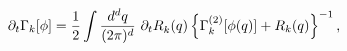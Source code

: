 \begin{equation}
\partial_t \Gamma_k[\phi] = {1 \over2} \int {d^dq\over (2\pi)^d}\
{\partial_t R}_k(q)
\left\{\Gamma_k^{(2)}[\phi(q)] + R_k(q)\right\}^{-1}
\mbox{,}
\label{eqflot}
\end{equation}

